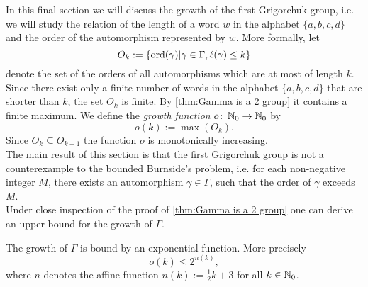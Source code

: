 In this final section we will discuss the growth of the first Grigorchuk group, i.e. we will study the relation of the length of a word $w$ in the alphabet $\lbrace a,b,c,d\rbrace$ and the order of the automorphism represented by $w$. More formally, let
\begin{equation*}
O_k:=\lbrace \operatorname{\mathrm{ord}}(\gamma)\vert\gamma\in\Gamma,\ell(\gamma)\leq k\rbrace
\end{equation*}
denote the set of the orders of all automorphisms which are at most of length $k$. Since there exist only a finite number of  words in the alphabet $\lbrace a,b,c,d\rbrace$ that are shorter than $k$, the set $O_k$ is finite. By \cref{thm:Gamma is a 2 group} it contains a  finite maximum.  We define the \emph{growth function} $o\colon \operatorname{\mathbb{N}}_0\to\operatorname{\mathbb{N}}_0$ by 
\begin{equation*}
o(k):=\max(O_k).
\end{equation*}
Since $O_k\subseteq O_{k+1}$ the function $o$ is monotonically increasing.\\
The main result of this section is that the first Grigorchuk group is not a counterexample to the bounded Burnside's problem, i.e. for each non-negative integer $M$, there exists an automorphism $\gamma\in\Gamma$, such that the order of $\gamma$ exceeds $M$.\\
Under close inspection of the proof of \cref{thm:Gamma is a 2 group} one can derive an upper bound for the growth of $\Gamma$.
\begin{cor}\label{thm:Upper bound for the growth of Gamma}
The growth of $\Gamma$ is bound by an exponential function. More precisely
\begin{equation}\label{eq:Upper bound for the growth of Gamma}
o(k)\leq 2^{n(k)},
\end{equation}
where $n$ denotes the affine function $n(k):=\frac{1}{2}k+3$ for all $k\in\operatorname{\mathbb{N}}_0$.
\end{cor}

